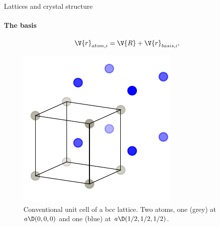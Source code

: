 \documentclass{beamer}
\begin{document}
\begin{frame}{Lattices and crystal structure}
\framesubtitle{The basis}
\pause
\begin{equation*}
	\V{r}_{atom,i} = \V{R} + \V{r}_{basis, i},
\end{equation*}
\pause
\begin{figure}[H]
	\centering
	\includegraphics[width=.35\linewidth]{figures/lattice_unfinished_1.pdf}
	\caption{Conventional unit cell of a bcc lattice. Two atoms, one (grey) at $ a \D (0,0,0) $ and one (blue) at $ a\D(1/2, 1/2, 1/2) $.}
\end{figure}
\end{frame}
\end{document}
